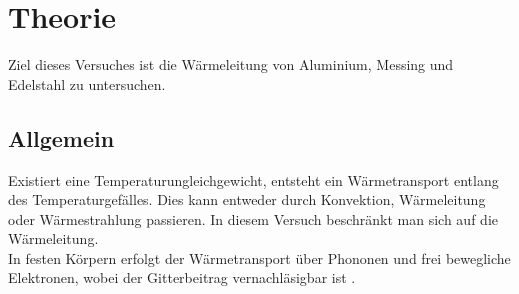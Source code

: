 \section{Theorie}
\label{sec:Theorie}
 
Ziel dieses Versuches ist die Wärmeleitung von Aluminium, Messing und Edelstahl zu untersuchen.

\subsection{Allgemein}

Existiert eine Temperaturungleichgewicht, entsteht ein Wärmetransport entlang des Temperaturgefälles. 
Dies kann entweder durch Konvektion, Wärmeleitung oder Wärmestrahlung passieren.
In diesem Versuch beschränkt man sich auf die Wärmeleitung.\\
In festen Körpern erfolgt der Wärmetransport über Phononen und frei bewegliche Elektronen, wobei der Gitterbeitrag vernachläsigbar ist \cite[1]{V204}.


